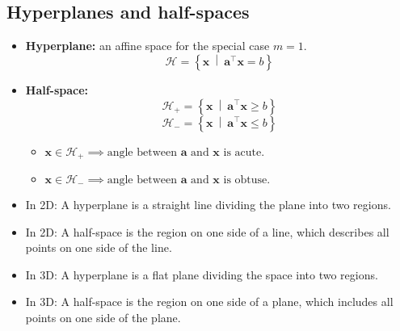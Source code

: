 \subsection{Hyperplanes and half-spaces}
\begin{definition}

    \begin{itemize}
        \item \textbf{Hyperplane:} an affine space for the special case \( m = 1 \).
            \begin{equation}
                \mathcal{H} = \left\{ \mathbf{x} \ \middle| \ \mathbf{a}^\top \mathbf{x} = b \right\}
            \end{equation}
    
        \item \textbf{Half-space:}
            \begin{equation}
                \mathcal{H}_{+} = \left\{ \mathbf{x} \ \middle| \ \mathbf{a}^\top \mathbf{x} \geq b \right\}
            \end{equation}
            \begin{equation}
                \mathcal{H}_{-} = \left\{ \mathbf{x} \ \middle| \ \mathbf{a}^\top \mathbf{x} \leq b \right\}
            \end{equation}
            \begin{itemize}
                \item $\mathbf{x} \in \mathcal{H}_{+} \implies \text{angle between } \mathbf{a} \text{ and } \mathbf{x} \text{ is acute.}$
                \item $\mathbf{x} \in \mathcal{H}_{-} \implies \text{angle between } \mathbf{a} \text{ and } \mathbf{x} \text{ is obtuse.}$
            \end{itemize}
    \end{itemize}

\end{definition}

\begin{intuition}
    \begin{itemize}
        \item In 2D: A hyperplane is a straight line dividing the plane into two regions.
        \item In 2D: A half-space is the region on one side of a line, which describes all points on one side of the line.
        \item In 3D: A hyperplane is a flat plane dividing the space into two regions.
        \item In 3D: A half-space is the region on one side of a plane, which includes all points on one side of the plane.
    \end{itemize}
\end{intuition}

